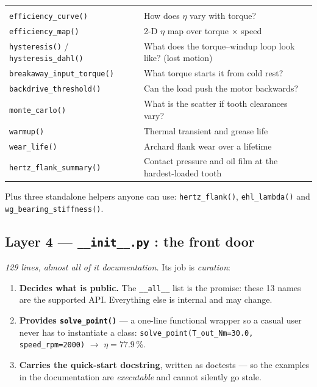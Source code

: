 \documentclass[11pt,a4paper]{article}
\newcommand{\pkg}[1]{\texttt{#1}}
\begin{document}
\begin{tabularx}{\textwidth}{@{}l Y@{}}
 &  \\
\pkg{efficiency\_curve()} & How does $\eta$ vary with torque? \\
\pkg{efficiency\_map()} & 2-D $\eta$ map over torque $\times$ speed \\
\pkg{hysteresis()} / \pkg{hysteresis\_dahl()} & What does the torque--windup
loop look like? (lost motion) \\
\pkg{breakaway\_input\_torque()} & What torque starts it from cold rest? \\
\pkg{backdrive\_threshold()} & Can the load push the motor backwards? \\
\pkg{monte\_carlo()} & What is the scatter if tooth clearances vary? \\
\pkg{warmup()} & Thermal transient and grease life \\
\pkg{wear\_life()} & Archard flank wear over a lifetime \\
\pkg{hertz\_flank\_summary()} & Contact pressure and oil film at the
hardest-loaded tooth \\
\end{tabularx}

\vspace{6pt}
\noindent Plus three standalone helpers anyone can use:
\pkg{hertz\_flank()},\newline
\pkg{ehl\_lambda()} and \pkg{wg\_bearing\_stiffness()}.

\subsection{Layer 4 --- \pkg{\_\_init\_\_.py} : the front door}

\emph{129 lines, almost all of it documentation.} Its job is \emph{curation}:

\begin{enumerate}
  \item \textbf{Decides what is public.} The \pkg{\_\_all\_\_} list is the
        promise: these 13 names are the supported API. Everything else is
        internal and may change.
  \item \textbf{Provides \pkg{solve\_point()}} --- a one-line functional
        wrapper so a casual user never has to instantiate a class:
        \pkg{solve\_point(T\_out\_Nm=30.0, speed\_rpm=2000)} $\rightarrow$
        $\eta = 77.9$\,\%.
  \item \textbf{Carries the quick-start docstring}, written as doctests --- so
        the examples in the documentation are \emph{executable} and cannot
        silently go stale.
\end{enumerate}
\end{document}
